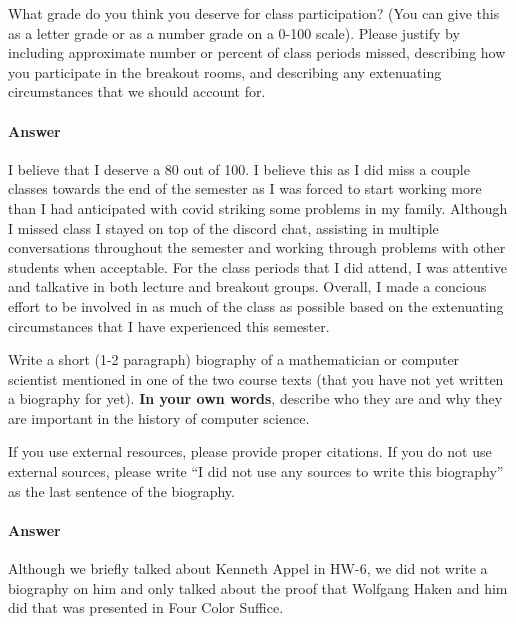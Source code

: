 \documentclass{article}
\begin{document}
What grade do you think you deserve for class participation? (You can give this
as a letter grade or as a number grade on a 0-100 scale). Please justify by
including approximate number or percent of class periods missed, describing how
you participate in the breakout rooms, and describing any extenuating
circumstances that we should account for.

\paragraph{Answer}

I believe that I deserve a 80 out of 100. I believe this as I did miss a couple classes towards the end of the 
semester as I was forced to start working more than I had anticipated with covid striking some problems in 
my family. Although I missed class I stayed on top of the discord chat, assisting in multiple conversations throughout 
the semester and working through problems with other students when acceptable. For the class periods that I did 
attend, I was attentive and talkative in both lecture and breakout groups. Overall, I made a concious effort to 
be involved in as much of the class as possible based on the extenuating circumstances that I have experienced this 
semester. 



Write a short (1-2 paragraph) biography of a mathematician or computer scientist
mentioned in one of the two course texts (that you have not yet written a
biography for yet).
\textbf{In your own words}, describe who they are and why they are important in
the history of computer science.

If you use external resources, please provide
proper citations. If you do not use external sources, please write ``I did not
use any sources to write this biography'' as the last sentence of the
biography.

\paragraph{Answer}

Although we briefly talked about Kenneth Appel in HW-6, we did not write a biography on him and 
only talked about the proof that Wolfgang Haken and him did that was presented in Four Color Suffice.
\end{document}
